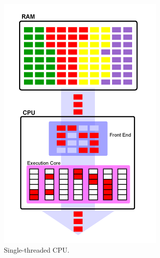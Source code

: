 \documentclass[doc,natbib,12pt]{apa6}
\begin{document}
	\begin{figure} [htpb]
		\centering
		\begin{subfigure}{.45\textwidth}
			\centering
			\includegraphics[width=1\linewidth]{single_thread-single_cpu.png}
			\caption{Single-threaded CPU. \citep{Stokes2002}}
			\label{fig:single_thread-single_cpu}
		\end{subfigure}%
		\begin{subfigure}{.45\textwidth}
			\centering

\end{subfigure}
\end{figure}
\end{document}
